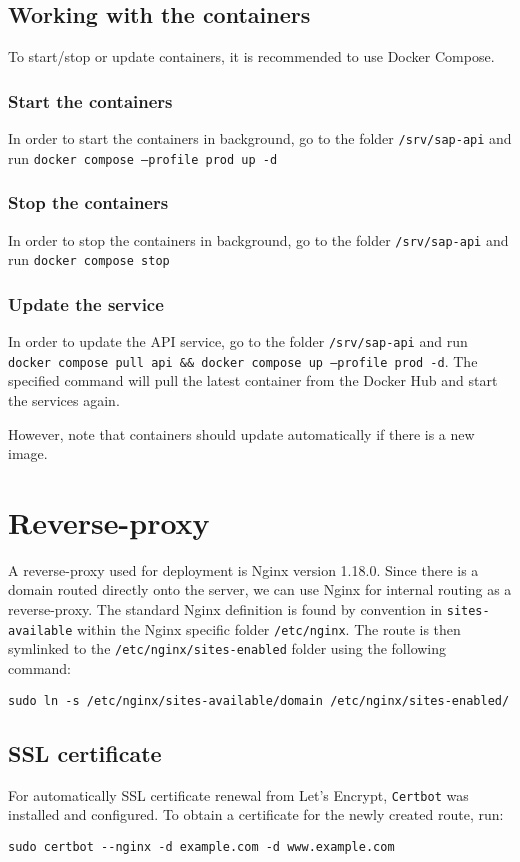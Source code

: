 \subsection{Working with the containers}
To start/stop or update containers, it is recommended to use Docker Compose.
\subsubsection{Start the containers}
In order to start the containers in background, go to the folder \texttt{/srv/sap-api} and run \texttt{docker compose --profile prod up -d}

\subsubsection{Stop the containers}
In order to stop the containers in background, go to the folder \texttt{/srv/sap-api} and run \texttt{docker compose stop}

\subsubsection{Update the service}
In order to update the API service, go to the folder \texttt{/srv/sap-api} and run \texttt{docker compose pull api \&\& docker compose up --profile prod -d}.
The specified command will pull the latest container from the Docker Hub and start the services again.

However, note that containers should update automatically if there is a new image.

\section{Reverse-proxy}
A reverse-proxy used for deployment is Nginx version 1.18.0.
Since there is a domain routed directly onto the server, we can use Nginx for internal routing as a reverse-proxy.
The standard Nginx definition is found by convention in \texttt{sites-available} within the Nginx specific folder \texttt{/etc/nginx}.
The route is then symlinked to the \texttt{/etc/nginx/sites-enabled} folder using the following command:
\begin{lstlisting}[caption={Command to create symbolic link by Nginx convention}]
sudo ln -s /etc/nginx/sites-available/domain /etc/nginx/sites-enabled/
\end{lstlisting}

\subsection{SSL certificate}
For automatically SSL certificate renewal from Let's Encrypt, \texttt{Certbot} was installed and configured.
To obtain a certificate for the newly created route, run:
\begin{lstlisting}[caption={Certbot command to obtain SSL certificate}]
sudo certbot --nginx -d example.com -d www.example.com
\end{lstlisting}






